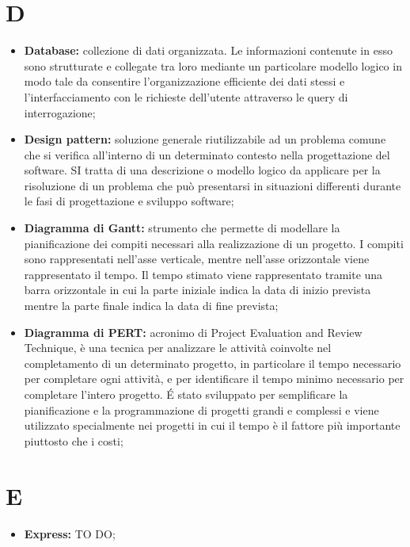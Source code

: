 \section*{D} %
\label{sec:d}
	\begin{itemize}
		\item \textbf{Database:} collezione di dati organizzata. Le informazioni contenute in esso sono strutturate e collegate tra loro mediante un particolare modello logico in modo tale da consentire l'organizzazione efficiente dei dati stessi e l'interfacciamento con le richieste dell'utente attraverso le query di interrogazione;
		\item \textbf{Design pattern:} soluzione generale riutilizzabile ad un problema comune che si verifica all'interno di un determinato contesto nella progettazione del software. SI tratta di una descrizione o modello logico da applicare per la risoluzione di un problema che può presentarsi in situazioni differenti durante le fasi di progettazione e sviluppo software;
		\item \textbf{Diagramma di Gantt:} strumento che permette di modellare la pianificazione dei compiti necessari alla realizzazione di un progetto. I compiti sono rappresentati nell'asse verticale, mentre nell'asse orizzontale viene rappresentato il tempo. Il tempo stimato viene rappresentato tramite una barra orizzontale in cui la parte iniziale indica la data di inizio prevista mentre la parte finale indica la data di fine prevista;
		\item \textbf{Diagramma di PERT:} acronimo di Project Evaluation and Review Technique, è una tecnica per analizzare le attività coinvolte nel completamento di un determinato progetto, in particolare il tempo necessario per completare ogni attività, e per identificare il tempo minimo necessario per completare l'intero progetto. É stato sviluppato per semplificare la pianificazione e la programmazione di progetti grandi e complessi e viene utilizzato specialmente nei progetti in cui il tempo è il fattore più importante piuttosto che i costi;
	\end{itemize}
\pagebreak

\section*{E} %
\label{sec:e}
	\begin{itemize}
		\item \textbf{Express:} TO DO;
	\end{itemize}
\pagebreak
